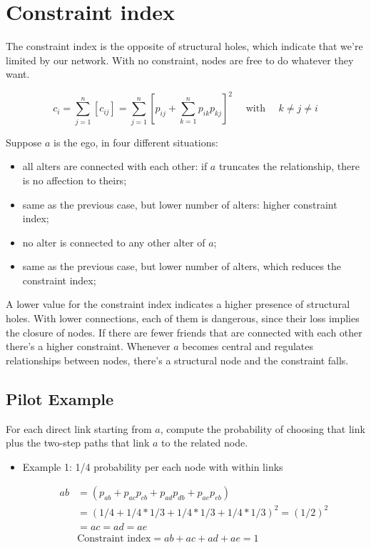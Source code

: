 \documentclass[
  notitlepage,
  onecolumn,
  openany]{book}
\providecommand{\tightlist}{%
  \setlength{\itemsep}{0pt}\setlength{\parskip}{0pt}}
\begin{document}
\hypertarget{constraint-index}{%
\section{Constraint index}\label{constraint-index}}

The constraint index is the opposite of structural holes, which indicate that we're limited by our network. With no constraint, nodes are free to do whatever they want.

\[
c_{i}=\sum_{j=1}^{n}\left[c_{i j}\right]=\sum_{j=1}^{n}\left[p_{i j}+\sum_{k=1}^{n} p_{i k} p_{k j}\right]^{2} \quad \text { with } \quad k \neq j \neq i
\]

Suppose \(a\) is the ego, in four different situations:

\begin{itemize}
\tightlist
\item
  all alters are connected with each other: if \(a\) truncates the relationship, there is no affection to theirs;
\item
  same as the previous case, but lower number of alters: higher constraint index;
\item
  no alter is connected to any other alter of \(a\);
\item
  same as the previous case, but lower number of alters, which reduces the constraint index;
\end{itemize}

A lower value for the constraint index indicates a higher presence of structural holes. With lower connections, each of them is dangerous, since their loss implies the closure of nodes. If there are fewer friends that are connected with each other there's a higher constraint. Whenever \(a\) becomes central and regulates relationships between nodes, there's a structural node and the constraint falls.

\hypertarget{pilot-example}{%
\subsection{Pilot Example}\label{pilot-example}}

For each direct link starting from \(a\), compute the probability of choosing that link plus the two-step paths that link \(a\) to the related node.

\begin{itemize}
\item
  Example 1: 1/4 probability per each node with within links

  \[
    \begin{aligned}
    ab &= (p_{ab}+p_{ac}p_{cb}+p_{ad}p_{db}+p_{ae}p_{eb})
    \\&= (1/4+1/4*1/3+1/4*1/3+1/4*1/3)^2 =(1/2)^2 \\
    & = ac = ad = ae\\
    &\text{Constraint index} = ab+ac+ad+ae = 1
    \end{aligned}
    \]
\end{itemize}
\end{document}
